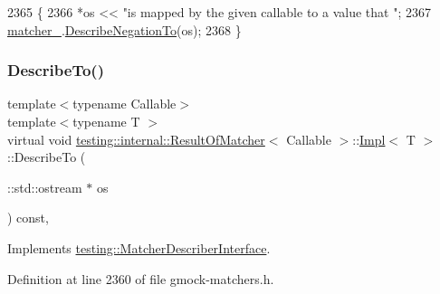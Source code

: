 \begin{DoxyCode}
2365                                                           \{
2366       *os << \textcolor{stringliteral}{"is mapped by the given callable to a value that "};
2367       \hyperlink{classtesting_1_1internal_1_1ResultOfMatcher_1_1Impl_a2ce504e44dae05b5e574e21def4f1cba}{matcher\_}.\hyperlink{classtesting_1_1internal_1_1MatcherBase_ac1089d49b6b8a381900618985cd69b7f}{DescribeNegationTo}(os);
2368     \}
\end{DoxyCode}
\mbox{\label{classtesting_1_1internal_1_1ResultOfMatcher_1_1Impl_ac414587b112d9fec788366c026fbb485}} 
\subsubsection{\texorpdfstring{Describe\+To()}{DescribeTo()}}
{\footnotesize\ttfamily template$<$typename Callable$>$ \\
template$<$typename T $>$ \\
virtual void \hyperlink{classtesting_1_1internal_1_1ResultOfMatcher}{testing\+::internal\+::\+Result\+Of\+Matcher}$<$ Callable $>$\+::\hyperlink{classtesting_1_1internal_1_1ResultOfMatcher_1_1Impl}{Impl}$<$ T $>$\+::Describe\+To (\begin{DoxyParamCaption}\item[{\+::std\+::ostream $\ast$}]{os }\end{DoxyParamCaption}) const\hspace{0.3cm}{\ttfamily [inline]}, {\ttfamily [virtual]}}



Implements \hyperlink{classtesting_1_1MatcherDescriberInterface_ad9f861588bd969b6e3e717f13bb94e7b}{testing\+::\+Matcher\+Describer\+Interface}.



Definition at line 2360 of file gmock-\/matchers.\+h.


